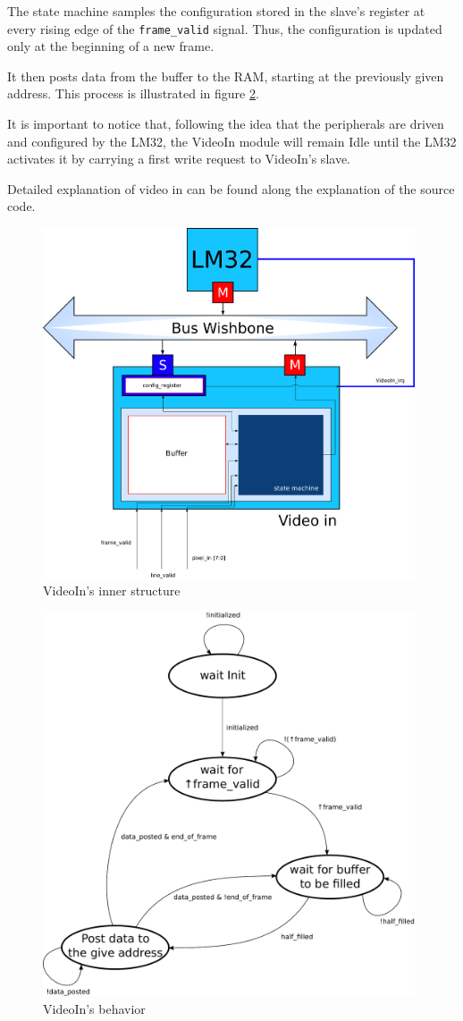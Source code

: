 The state machine samples the configuration stored in the slave's register at every rising edge of the \texttt{frame\_valid} signal. Thus, the configuration is updated only at the beginning of a new frame.

It then posts data from the buffer to the RAM, starting at the previously given address. This process is illustrated in figure \ref{VideoIn_sm}. 

It is important to notice that, following the idea that the peripherals are driven and configured by the LM32, the VideoIn module will remain Idle until the LM32 activates it by carrying a first write request to VideoIn's slave.

Detailed explanation of video in can be found along the explanation of the source code.

\begin{figure}[h]
\center
\includegraphics[width=11cm]{figs/Video_In_blocks.pdf}
\caption{VideoIn's inner structure}
\label{VideoIn_struct}
\end{figure}


\begin{figure}[h]
\center
\includegraphics[width=11cm]{figs/video_in_sm.pdf}
\caption{VideoIn's behavior}
\label{VideoIn_sm}
\end{figure}

